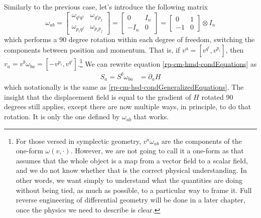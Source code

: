 Similarly to the previous case, let's introduce the following matrix
\begin{equation}\label{rp-cm-hmd-symplecticForm}
	\tag{SF-N}
	\omega_{ab} = \left[\begin{array}{cc}
		\omega_{q^i q^j} & \omega_{q^i p_j} \\
		\omega_{p_i q^j} & \omega_{p_i p_j} 
	\end{array} \right]= \left[\begin{array}{cc}
		0 & I_n \\
		- I_n & 0 
	\end{array} \right] = \left[\begin{array}{cc}
	0 & 1 \\
	-1 & 0 
\end{array} \right] \otimes I_n
\end{equation}
which performs a 90 degree rotation within each degree of freedom, switching the components between position and momentum. That is, if $v^a = [v^{q^i}, v^{p_i}]$, then $v_a = v^b \omega_{ba}  = [-v^{p_i}, v^{q^i}]$.\footnote{For those versed in symplectic geometry, $v^a \omega_{ab}$ are the components of the one-form $\omega(v, \cdot)$. However, we are not going to call it a one-form as that assumes that the whole object is a map from a vector field to a scalar field, and we do not know whether that is the correct physical understanding. In other words, we want simply to understand what the quantities are doing without being tied, as much as possible, to a particular way to frame it. Full reverse engineering of differential geometry will be done in a later chapter, once the physics we need to describe is clear.} We can rewrite equation \ref{rp-cm-hmd-condEquations} as
\begin{equation}\label{rp-hm-HamiltonSymp}
	\begin{aligned}
		S_a = S^b \omega_{ba}  &= \partial_a H 
	\end{aligned}
\end{equation}
which notationally is the same as \ref{rp-cm-hsd-condGeneralizedEquations}. The insight that the displacement field is equal to the gradient of $H$ rotated 90 degrees still applies, except there are now multiple ways, in principle, to do that rotation. It is only the one defined by $\omega_{ab}$ that works.

